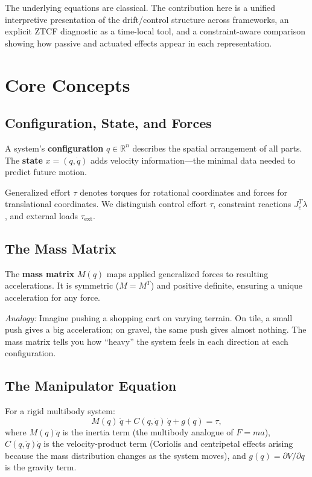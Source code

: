 \documentclass[11pt]{article}
\begin{document}
The underlying equations are classical. The contribution here is a unified interpretive presentation of the drift/control structure across frameworks, an explicit ZTCF diagnostic as a time-local tool, and a constraint-aware comparison showing how passive and actuated effects appear in each representation.


\section{Core Concepts}\label{sec:core-concepts}

\subsection{Configuration, State, and Forces}

A system's \textbf{configuration} $q \in \mathbb{R}^n$ describes the spatial arrangement of all parts. The \textbf{state} $x = (q, \dot{q})$ adds velocity information---the minimal data needed to predict future motion.

Generalized effort $\tau$ denotes torques for rotational coordinates and forces for translational coordinates. We distinguish control effort $\tau$, constraint reactions $J_c^T\lambda$, and external loads $\tau_{\mathrm{ext}}$.

\subsection{The Mass Matrix}

The \textbf{mass matrix} $M(q)$ maps applied generalized forces to resulting accelerations. It is symmetric ($M = M^T$) and positive definite, ensuring a unique acceleration for any force.

\textit{Analogy:} Imagine pushing a shopping cart on varying terrain. On tile, a small push gives a big acceleration; on gravel, the same push gives almost nothing. The mass matrix tells you how ``heavy'' the system feels in each direction at each configuration.

\subsection{The Manipulator Equation}

For a rigid multibody system:
\begin{equation}\label{eq:manipulator}
M(q)\,\ddot{q} + C(q,\dot{q})\,\dot{q} + g(q) = \tau,
\end{equation}
where $M(q)\ddot{q}$ is the inertia term (the multibody analogue of $F=ma$), $C(q,\dot{q})\dot{q}$ is the velocity-product term (Coriolis and centripetal effects arising because the mass distribution changes as the system moves), and $g(q) = \partial V/\partial q$ is the gravity term.
\end{document}
